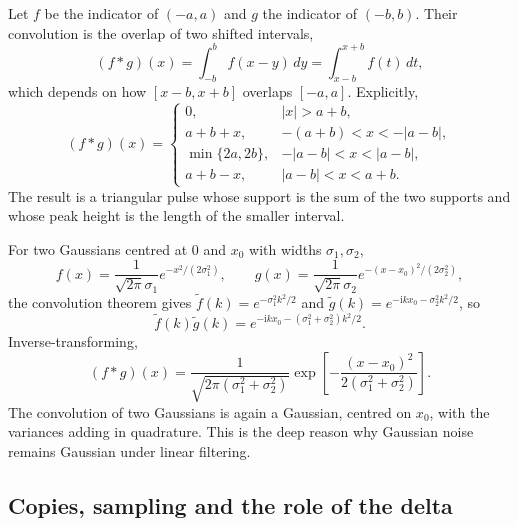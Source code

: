 \begin{example}
Let $f$ be the indicator of $(-a,a)$ and $g$ the indicator of $(-b,b)$. Their convolution is the overlap of two shifted intervals,
\begin{equation}
(f*g)(x)=\int_{-b}^{b}f(x-y)\,dy=\int_{x-b}^{x+b}f(t)\,dt,
\end{equation}
which depends on how $[x-b,x+b]$ overlaps $[-a,a]$. Explicitly,
\begin{equation}
(f*g)(x)=
\begin{cases}
0,&|x|>a+b,\\
a+b+x,&-(a+b)<x<-|a-b|,\\
\min\{2a,2b\},&-|a-b|<x<|a-b|,\\
a+b-x,&|a-b|<x<a+b.
\end{cases}
\end{equation}
The result is a triangular pulse whose support is the sum of the two supports and whose peak height is the length of the smaller interval.
\end{example}

\begin{example}
For two Gaussians centred at $0$ and $x_0$ with widths $\sigma_1,\sigma_2$,
\begin{equation}
f(x)=\frac{1}{\sqrt{2\pi}\sigma_1}e^{-x^2/(2\sigma_1^2)},\qquad
g(x)=\frac{1}{\sqrt{2\pi}\sigma_2}e^{-(x-x_0)^2/(2\sigma_2^2)},
\end{equation}
the convolution theorem gives $\widetilde f(k)=e^{-\sigma_1^2k^2/2}$ and $\widetilde g(k)=e^{-\mathrm{i}kx_0-\sigma_2^2k^2/2}$, so
\begin{equation}
\widetilde f(k)\widetilde g(k)=e^{-\mathrm{i}kx_0-(\sigma_1^2+\sigma_2^2)k^2/2}.
\end{equation}
Inverse-transforming,
\begin{equation}
(f*g)(x)=\frac{1}{\sqrt{2\pi(\sigma_1^2+\sigma_2^2)}}\exp\!\left[-\frac{(x-x_0)^2}{2(\sigma_1^2+\sigma_2^2)}\right].
\end{equation}
The convolution of two Gaussians is again a Gaussian, centred on $x_0$, with the variances adding in quadrature. This is the deep reason why Gaussian noise remains Gaussian under linear filtering.
\end{example}

\subsection{Copies, sampling and the role of the delta}

